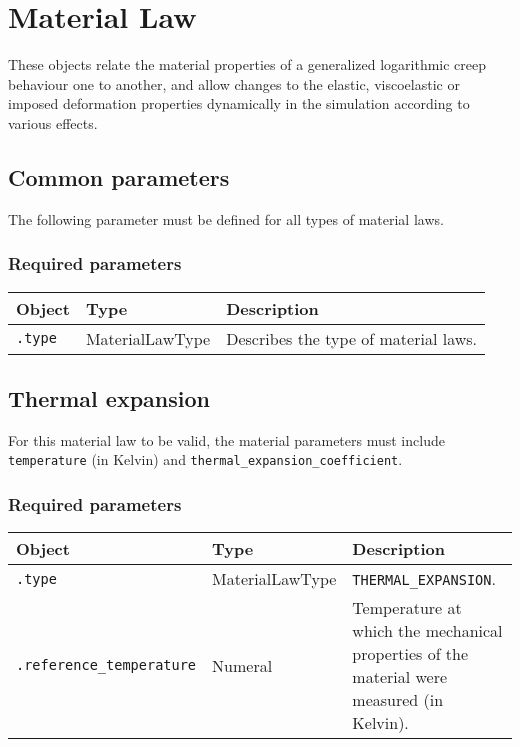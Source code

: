 \documentclass[10pt]{article}
\begin{document}
\section{Material Law}

These objects relate the material properties of a generalized logarithmic creep behaviour one to another, and allow changes to the elastic, viscoelastic or imposed deformation properties dynamically in the simulation according to various effects.

\subsection{Common parameters}

The following parameter must be defined for all types of material laws.

\subsubsection*{Required parameters}

\begin{tabularx}{\textwidth}{llX}
\hline 
Object & Type & Description \\ 
\hline 
\verb+.type+ & MaterialLawType & Describes the type of material laws. \\ 
\hline 
\end{tabularx}

\subsection{Thermal expansion}

For this material law to be valid, the material parameters must include \verb+temperature+ (in Kelvin) and \verb+thermal_expansion_coefficient+.

\subsubsection*{Required parameters}

\begin{tabularx}{\textwidth}{llX}
\hline 
Object & Type & Description \\ 
\hline 
\verb+.type+ & MaterialLawType & \verb+THERMAL_EXPANSION+. \\ 
\verb+.reference_temperature+ & Numeral & Temperature at which the mechanical properties of the material were measured (in Kelvin). \\ 
\hline 
\end{tabularx}
\end{document}
